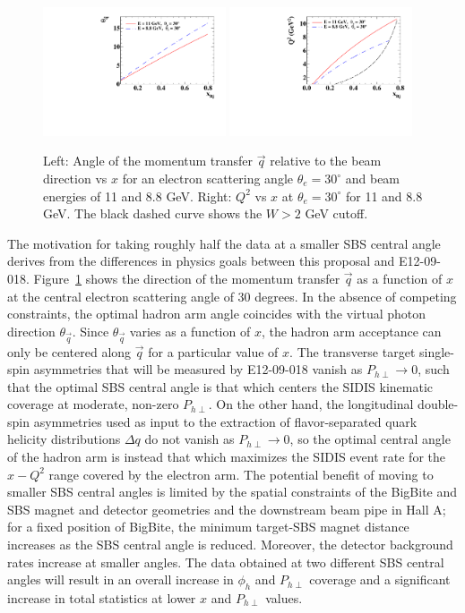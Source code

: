 \begin{figure}[h]
  \begin{center}
    \includegraphics[width=0.48\textwidth]{figures/thqxfig.pdf}
    \includegraphics[width=0.48\textwidth]{figures/Q2xfig.pdf}
  \end{center}
  \caption{\label{fig:thqx} Left: Angle of the momentum transfer $\vec{q}$ relative to the beam direction vs $x$ for an electron scattering angle $\theta_e = 30^\circ $ and beam energies of 11 and 8.8 GeV. Right: $Q^2$ vs $x$ at $\theta_e = 30^\circ$ for 11 and 8.8 GeV. The black dashed curve shows the $W > 2$ GeV cutoff.}
\end{figure}
The motivation for taking roughly half the data at a smaller SBS central angle derives from the differences in physics goals between this proposal and E12-09-018. Figure~\ref{fig:thqx} shows the direction of the momentum transfer $\vec{q}$ as a function of $x$ at the central electron scattering angle of 30 degrees. In the absence of competing constraints, the optimal hadron arm angle coincides with the virtual photon direction $\theta_{\vec{q}}$. Since $\theta_{\vec{q}}$ varies as a function of $x$, the hadron arm acceptance can only be centered along $\vec{q}$ for a particular value of $x$. The transverse target single-spin asymmetries that will be measured by E12-09-018 vanish as $P_{h\perp} \rightarrow 0$, such that the optimal SBS central angle is that which centers the SIDIS kinematic coverage at moderate, non-zero $P_{h\perp}$. On the other hand, the longitudinal double-spin asymmetries used as input to the extraction of flavor-separated quark helicity distributions $\Delta q$ do not vanish as $P_{h\perp} \rightarrow 0$, so the optimal central angle of the hadron arm is instead that which maximizes the SIDIS event rate for the $x-Q^2$ range covered by the electron arm. The potential benefit of moving to smaller SBS central angles is limited by the spatial constraints of the BigBite and SBS magnet and detector geometries and the downstream beam pipe in Hall A; for a fixed position of BigBite, the minimum target-SBS magnet distance increases as the SBS central angle is reduced. Moreover, the detector background rates increase at smaller angles. The data obtained at two different SBS central angles will result in an overall increase in $\phi_h$ and $P_{h\perp}$ coverage and a significant increase in total statistics at lower $x$ and $P_{h\perp}$ values. 
